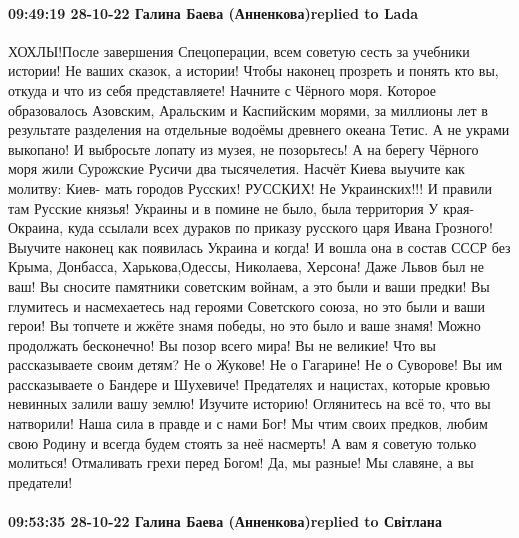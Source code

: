  
 
 
 
 

\paragraph{09:49:19 28-10-22 Галина Баева (Анненкова)replied to Lada}

ХОХЛЫ!После завершения Спецоперации, всем советую сесть за учебники истории! Не ваших сказок, а истории! Чтобы наконец прозреть и понять кто вы, откуда и что из себя представляете! Начните с Чёрного моря. Которое образовалось Азовским, Аральским и Каспийским морями, за миллионы лет в результате разделения на отдельные водоёмы древнего океана Тетис. А не украми выкопано!
И выбросьте лопату из музея, не позорьтесь! А на берегу Чёрного моря жили Сурожские Русичи два тысячелетия.
Насчёт Киева выучите как молитву: Киев- мать городов Русских! РУССКИХ! Не Украинских!!! И правили там Русские князья! Украины и в помине не было, была территория
У края-Окраина, куда ссылали всех дураков по приказу русского царя Ивана Грозного!
Выучите наконец как появилась Украина и когда! И вошла она в состав СССР без Крыма, Донбасса, Харькова,Одессы, Николаева, Херсона! Даже Львов был не ваш! Вы сносите памятники советским войнам, а это были и ваши предки!
Вы глумитесь и насмехаетесь над героями Советского союза, но это были и ваши герои! Вы топчете и жжёте знамя победы, но это было и ваше знамя! Можно продолжать бесконечно!
Вы позор всего мира! Вы не великие! Что вы рассказываете своим детям? Не о Жукове! Не о Гагарине! Не о Суворове!
Вы им рассказываете о Бандере и Шухевиче! Предателях и нацистах, которые кровью невинных залили вашу землю!
Изучите историю! Оглянитесь на всё то, что вы натворили!
Наша сила в правде и с нами Бог! Мы чтим своих предков, любим свою Родину и всегда будем стоять за неё насмерть!
А вам я советую только молиться! Отмаливать грехи перед Богом! Да, мы разные!
Мы славяне, а вы предатели!

\paragraph{09:53:35 28-10-22 Галина Баева (Анненкова)replied to Світлана}

